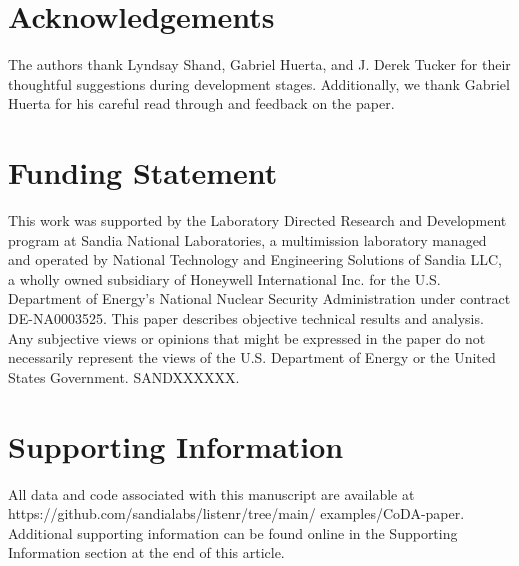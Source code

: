 \documentclass[AMS,STIX2COL]{WileyNJD-v2}
\begin{document}
\section*{Acknowledgements} 

The authors thank Lyndsay Shand, Gabriel Huerta, and J. Derek Tucker for their thoughtful suggestions during development stages. Additionally, we thank Gabriel Huerta for his careful read through and feedback on the paper.

\section*{Funding Statement} 

This work was supported by the Laboratory Directed Research and Development program at Sandia National Laboratories, a multimission laboratory managed and operated by National Technology and Engineering Solutions of Sandia LLC, a wholly owned subsidiary of Honeywell International Inc. for the U.S. Department of Energy's National Nuclear Security Administration under contract DE-NA0003525. This paper describes objective technical results and analysis. Any subjective views or opinions that might be expressed in the paper do not necessarily represent the views of the U.S. Department of Energy or the United States Government. SANDXXXXXX.

\section*{Supporting Information} 

All data and code associated with this manuscript are available at https://github.com/sandialabs/listenr/tree/main/ examples/CoDA-paper. Additional supporting information can be found online in the Supporting Information section at the end of this article.




\end{document}
